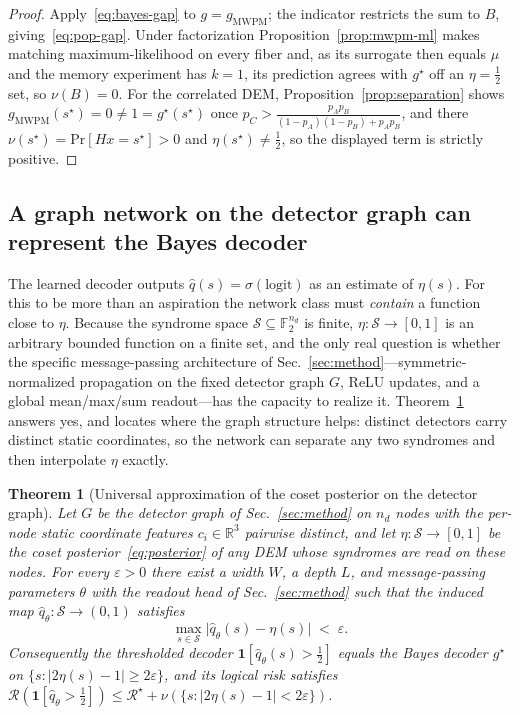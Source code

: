 \documentclass[aps,prxquantum,twocolumn,superscriptaddress,nofootinbib,longbibliography]{revtex4-2}
\newtheorem{theorem}{Theorem}
\newcommand{\R}{\mathbb{R}}
\newcommand{\F}{\mathbb{F}}
\newcommand{\PR}{\mathrm{Pr}}
\newcommand{\eps}{\varepsilon}
\newcommand{\ind}[1]{\mathbf{1}\!\left[#1\right]}
\newcommand{\cS}{\mathcal{S}}
\newcommand{\Risk}{\mathcal{R}}
\begin{document}
\begin{proof}
Apply~\eqref{eq:bayes-gap} to $g=g_{\mathrm{MWPM}}$; the indicator restricts the
sum to $B$, giving~\eqref{eq:pop-gap}. Under factorization
Proposition~\ref{prop:mwpm-ml} makes matching maximum-likelihood on every fiber
and, as its surrogate then equals $\mu$ and the memory experiment has $k=1$, its
prediction agrees with $g^\star$ off an $\eta=\tfrac12$ set, so $\nu(B)=0$. For
the correlated DEM, Proposition~\ref{prop:separation} shows
$g_{\mathrm{MWPM}}(s^\star)=0\neq 1=g^\star(s^\star)$ once
$p_C>\frac{p_Ap_B}{(1-p_A)(1-p_B)+p_Ap_B}$, and there
$\nu(s^\star)=\PR[Hx=s^\star]>0$ and $\eta(s^\star)\neq\tfrac12$, so the displayed
term is strictly positive.
\end{proof}

\subsection{A graph network on the detector graph can represent the Bayes decoder}
\label{ssec:express}

The learned decoder outputs $\hat q(s)=\sigma(\text{logit})$ as an estimate of
$\eta(s)$. For this to be more than an aspiration the network class must
\emph{contain} a function close to $\eta$. Because the syndrome space
$\cS\subseteq\F_2^{n_d}$ is finite, $\eta:\cS\to[0,1]$ is an arbitrary bounded
function on a finite set, and the only real question is whether the specific
message-passing architecture of Sec.~\ref{sec:method}---symmetric-normalized
propagation on the fixed detector graph $G$, ReLU updates, and a global
mean/max/sum readout---has the capacity to realize it. Theorem~\ref{thm:express}
answers yes, and locates where the graph structure helps: distinct detectors
carry distinct static coordinates, so the network can separate any two syndromes
and then interpolate $\eta$ exactly.

\begin{theorem}[Universal approximation of the coset posterior on the detector graph]
\label{thm:express}
Let $G$ be the detector graph of Sec.~\ref{sec:method} on $n_d$ nodes with the
per-node static coordinate features $c_i\in\R^3$ pairwise distinct, and let
$\eta:\cS\to[0,1]$ be the coset posterior~\eqref{eq:posterior} of any DEM whose
syndromes are read on these nodes. For every $\eps>0$ there exist a width $W$, a
depth $L$, and message-passing parameters $\theta$ with the readout head of
Sec.~\ref{sec:method} such that the induced map
$\hat q_\theta:\cS\to(0,1)$ satisfies
\begin{equation}
  \max_{s\in\cS}\big|\hat q_\theta(s)-\eta(s)\big|\;<\;\eps .
\end{equation}
Consequently the thresholded decoder $\ind{\hat q_\theta(s)>\tfrac12}$ equals the
Bayes decoder $g^\star$ on $\{s:|2\eta(s)-1|\ge 2\eps\}$, and its logical risk
satisfies $\Risk(\ind{\hat q_\theta>\tfrac12})\le\Risk^\star+
\nu(\{s:|2\eta(s)-1|<2\eps\})$.
\end{theorem}
\end{document}
